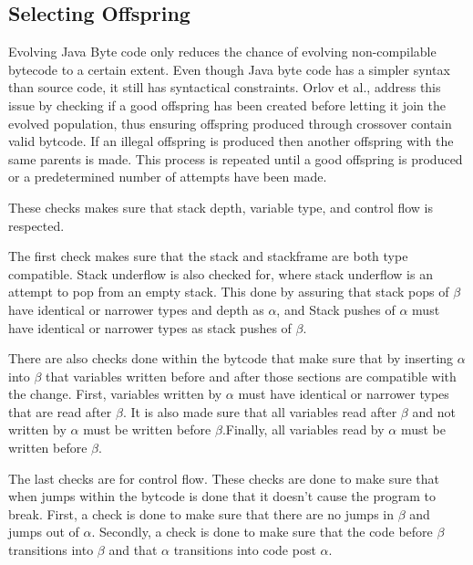 \documentclass{sig-alternate}
\begin{document}
\subsection{Selecting Offspring}
Evolving Java Byte code only reduces the chance of evolving non-compilable bytecode to a certain extent. Even though Java byte code has a simpler syntax than source code, it still has syntactical constraints. Orlov et al.,\cite{FINCH2:2009} address this issue by checking if a good offspring has been created before letting it join the evolved population, thus ensuring offspring produced through crossover contain valid bytcode. If an illegal offspring is produced then another offspring with the same parents is made. This process is repeated until a good offspring is produced or a predetermined number of attempts have been made.\par
These checks makes sure that stack depth, variable type, and control flow is respected.

The first check makes sure that the stack and stackframe are both type compatible. Stack underflow is also checked for, where stack underflow is an attempt to pop from an empty stack. This done by assuring that stack pops of $\beta$ have identical or narrower types and depth as $\alpha$, and Stack pushes of $\alpha$ must have identical or narrower types as stack pushes of $\beta$.

There are also checks done within the bytcode that make sure that by inserting $\alpha$ into $\beta$ that variables written before and after those sections are compatible with the change. 
First, variables written by $\alpha$ must have identical or narrower types that are read after $\beta$. It is also made sure that all variables read after $\beta$ and not written by $\alpha$ must be written before $\beta$.Finally, all variables read by $\alpha$ must be written before $\beta$.

The last checks are for control flow. These checks are done to make sure that when jumps within the bytcode is done that it doesn't cause the program to break. First, a check is done to make sure that there are no jumps in $\beta$ and jumps out of $\alpha$. Secondly, a check is done to make sure that the code before $\beta$ transitions into $\beta$ and that $\alpha$ transitions into code post $\alpha$.\par
\end{document}
